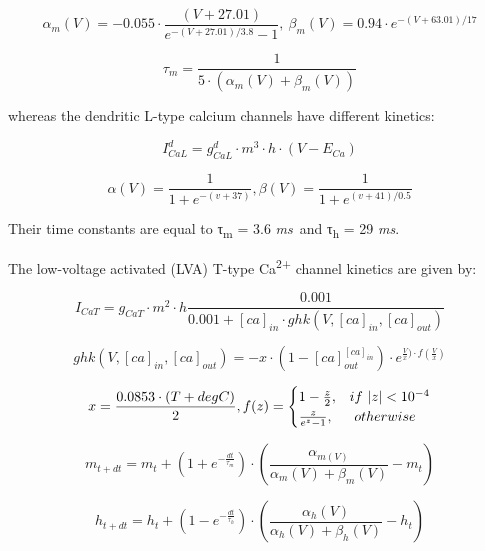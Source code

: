 \documentclass[a4paper]{article}
\begin{document}
\begin{equation}
α_m(V)=-0.055\cdot \frac{(V+27.01)}{e^{-(V+27.01)/3.8}-1} , \  β_m(V)=0.94\cdot e^{-(V+63.01)/17}
\end{equation}

\begin{equation}
τ_m=\frac {1}{5\cdot (α_m(V)+β_m(V))}
\end{equation}

whereas the dendritic L-type calcium channels have different kinetics: 


\begin{equation}
I_{CaL}^d= g_{CaL}^d \cdot m^3 \cdot h \cdot
(V-E_{Ca})
\end{equation}

\begin{equation}
α(V)=\frac {1}{1+e^{-(v+37)}},β(V)=\frac {1}{1+e^{(v+41)/0.5}}
\end{equation}


Their time constants are equal to τ\textsubscript{m}\textit{ }=\textit{ }3.6\textit{ ms}~and τ\textsubscript{h}\textit{
}=\textit{ }29\textit{ ms}.



The low-voltage activated (LVA) T-type Ca\textsuperscript{2+} channel kinetics are given by:


\begin{equation}
I_{CaT}= g_{CaT}\cdot m^2\cdot
h\frac{0.001 }{0.001+[ca]_{in}\cdot
ghk(V,[ca]_{in},[ca]_{out})}
\end{equation}

\begin{equation}
ghk(V, [ca]_{in}, [ca]_{out})=-x\cdot
(1 - [ca]_{out}^{[ca]_{in}})\cdot
e^{\frac {V} {x})\cdot f(\frac {V}{x})}
\end{equation}

\begin{equation}
x=\frac{0.0853\cdot (T+degC)}{2}, \\
f(z) = \begin{cases} 1-\frac {z}{2}, & if \ |z|<10^{-4} \\ \frac z{e^z-1}, & \  otherwise \ \end{cases}
\end{equation}

\begin{equation}
m_{t+dt}=m_t+(1+e^{-\frac{dt}{τ_m}})\cdot
(\frac{α_{m(V)}}{α_m(V)+β_m(V)}-m_t)
\end{equation}

\begin{equation}
h_{t+dt}=h_t+(1-e^{-\frac{dt}{τ_h}})\cdot
(\frac{α_h(V)}{α_h(V)+β_h(V)}-h_t)
\end{equation}
\end{document}
